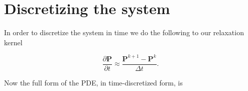 \documentclass[16pt]{article} %
\begin{document}
%
%
%
%
%
%

%
\newpage
\section{Discretizing the system}
In order to discretize the system in time we do the following to our relaxation kernel

$$\frac{\partial \textbf{P}}{\partial t} \approx \frac{\textbf{P}^{k+1} - \textbf{P}^k}{\Delta t}.$$

Now the full form of the PDE, in time-discretized form, is
\end{document}
